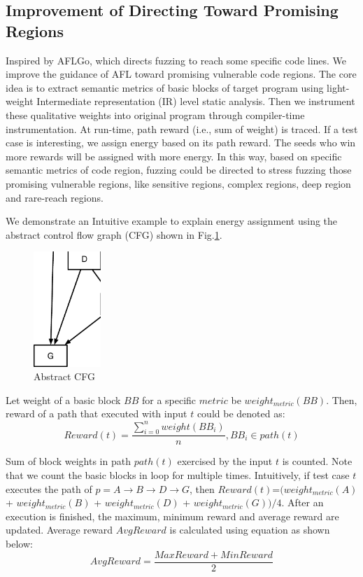 \subsection{Improvement of Directing Toward Promising Regions}
Inspired by AFLGo, which directs fuzzing to reach some specific code lines. We improve the guidance of AFL toward promising vulnerable code regions. The core idea is to extract semantic metrics of basic blocks of target program using light-weight Intermediate representation (IR) level static analysis. Then we instrument these qualitative weights into original program through compiler-time instrumentation. At run-time, path reward (i.e., sum of weight) is traced. If a test case is interesting, we assign energy based on its path reward. The seeds who win more rewards will be assigned with more energy. In this way, based on specific semantic metrics of code region, fuzzing could be directed to stress fuzzing those promising vulnerable regions, like sensitive regions, complex regions, deep region and rare-reach regions. 

We demonstrate an Intuitive example to explain energy assignment using the abstract control flow graph (CFG) shown in Fig.\ref{cfg}. 

\begin{figure}[t]
\centering
\includegraphics[width=1in]{pic/AbstractCFG.eps}
\caption{Abstract CFG}
\label{cfg}
\end{figure}

Let weight of a basic block $BB$ for a specific $metric$ be $weight_{metric}(BB)$. Then, reward of a path that executed with input $t$ could be denoted as:
\begin{equation}
Reward(t)=  \frac{\sum_{i=0}^{n} weight(BB_{i})}{n}, BB_{i} \in path(t)
\end{equation}

Sum of block weights in path $path(t)$ exercised by the input $t$ is counted. Note that we count the basic blocks in loop for multiple times. Intuitively, if test case $t$ executes the path of $p= A \rightarrow B \rightarrow D \rightarrow G$, then $Reward(t)$=$(weight_{metric}(A)$ + $weight_{metric}(B)$ + $weight_{metric}(D)$ + $weight_{metric}(G) )/4$. After an execution is finished,  the maximum, minimum reward and average reward are updated. Average reward $AvgReward$ is calculated using equation as shown below:
\begin{equation}
 AvgReward = \dfrac{MaxReward + MinReward} {2}
 \end{equation}
 
